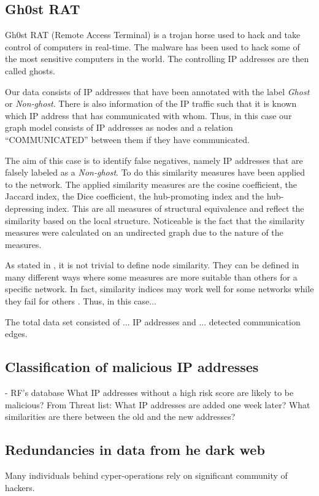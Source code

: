 \subsection{Gh0st RAT}
Gh0st RAT (Remote Access Terminal) is a trojan horse used to hack and take control of computers in real-time. The malware has been used to hack some of the most sensitive computers in the world. The controlling IP addresses are then called ghosts.


Our data consists of IP addresses that have been annotated with the label \textit{Ghost} or \textit{Non-ghost}. There is also information of the IP traffic such that it is known which IP address that has communicated with whom. Thus, in this case our graph model consists of IP addresses as nodes and a relation ``COMMUNICATED'' between them if they have communicated.

The aim of this case is to identify false negatives, namely IP addresses that are falsely labeled as a \textit{Non-ghost}. To do this similarity measures have been applied to the network. The applied similarity measures are the cosine coefficient, the Jaccard index, the Dice coefficient, the hub-promoting index and the hub-depressing index. This are all measures of structural equivalence and reflect the similarity based on the local structure. Noticeable is the fact that the similarity measures were calculated on an undirected graph due to the nature of the measures. 

As stated in , it is not trivial to define node similarity. They can be defined in many different ways where some measures are more suitable than others for a specific network. In fact, similarity indices may work well for some networks while they fail for others \citet{lu2011}. Thus, in this case...

The total data set consisted of ... IP addresses and ... detected communication edges. 

\subsection{Classification of malicious IP addresses }
- RF’s database
What IP addresses without a high risk score are likely to be malicious?
From Threat list: What IP addresses are added one week later? What similarities are there between the old and the new addresses? 

\subsection{Redundancies in data from he dark web}
Many individuals behind cyper-operations rely on significant community of hackers. 

